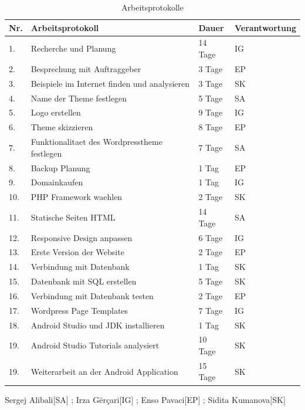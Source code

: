 \begin{table}
\begin{center}
\begin{tabular}{ |l|l|l|l| }
\hline
\textbf{Nr.} & \textbf{Arbeitsprotokoll} & \textbf{Dauer} & \textbf{Verantwortung} \\
\hline
1. & Recherche und Planung & 14 Tage & IG \\
\hline
2. & Besprechung mit Auftraggeber & 3 Tage & EP \\
\hline
3. & Beispiele im Internet finden und analysieren & 3 Tage & SK \\
\hline
4. & Name der Theme festlegen & 5 Tage & SA \\
\hline
5. & Logo erstellen & 9 Tage & IG \\
\hline 
6. & Theme skizzieren & 8 Tage & EP \\
\hline
7. & Funktionalitaet des Wordpresstheme festlegen & 7 Tage & SA \\
\hline
8. & Backup Planung & 1 Tag & EP \\
\hline
9. & Domainkaufen & 1 Tag & IG \\
\hline 
10. & PHP Framework waehlen & 2 Tage & SK \\
\hline
11. & Statische Seiten HTML & 14 Tage & SA \\
\hline
12. & Responsive Design anpassen & 6 Tage & IG \\
\hline
13. & Erste Version der Website & 2 Tage & EP \\
\hline
14. & Verbindung mit Datenbank & 1 Tag & SK \\
\hline
15. & Datenbank mit SQL erstellen & 5 Tage & SK \\
\hline
16. & Verbindung mit Datenbank testen & 2 Tage & EP \\
\hline
17. & Wordpress Page Templates & 7 Tage & IG \\
\hline
18. & Android Studio  und JDK installieren & 1 Tag & SK \\
\hline
19. & Android Studio  Tutorials analysiert & 10 Tage & SK \\
\hline
19. & Weiterarbeit an der Android Application & 15 Tage & SK \\
\hline
\end{tabular}
\end{center}
\caption{Arbeitsprotokolle}
\end{table}


Sergej Alibali[SA] ; Irza G\"er\c{c}ari[IG] ; Enso Pavaci[EP] ; Sidita Kumanova[SK]

